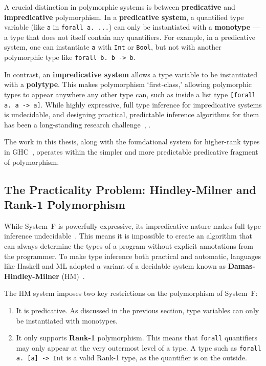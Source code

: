 A crucial distinction in polymorphic systems is between \textbf{predicative} and \textbf{impredicative} polymorphism. In a \textbf{predicative system}, a quantified type variable (like \texttt{a} in \texttt{forall a. ...}) can only be instantiated with a \textbf{monotype} --- a type that does not itself contain any quantifiers. For example, in a predicative system, one can instantiate \texttt{a} with \texttt{Int} or \texttt{Bool}, but not with another polymorphic type like \texttt{forall b. b -> b}.

In contrast, an \textbf{impredicative system} allows a type variable to be instantiated with a \textbf{polytype}. This makes polymorphism `first-class,' allowing polymorphic types to appear anywhere any other type can, such as inside a list type \texttt{[forall a. a -> a]}. While highly expressive, full type inference for impredicative systems is undecidable, and designing practical, predictable inference algorithms for them has been a long-standing research challenge~\cite{serrano-quick-2020}, .

The work in this thesis, along with the foundational system for higher-rank types in GHC~\cite{jones-practical-2007}, operates within the simpler and more predictable predicative fragment of polymorphism.

\subsection{The Practicality Problem: Hindley-Milner and Rank-1 Polymorphism}

While System~F is powerfully expressive, its impredicative nature makes full type inference undecidable~\cite{wells-typability-1999}. This means it is impossible to create an algorithm that can always determine the types of a program without explicit annotations from the programmer. To make type inference both practical and automatic, languages like Haskell and ML adopted \cite{jones-practical-2007} a variant of a decidable system known as \textbf{Damas-Hindley-Milner} (HM)~\cite{damas-milner}.

The HM system imposes two key restrictions on the polymorphism of System~F:
\begin{enumerate}
    \item It is predicative. As discussed in the previous section, type variables can only be instantiated with monotypes.
    \item It only supports \textbf{Rank-1} polymorphism. This means that \texttt{forall} quantifiers may only appear at the very outermost level of a type. A type such as \texttt{forall a. [a] -> Int} is a valid Rank-1 type, as the quantifier is on the outside.
\end{enumerate}

